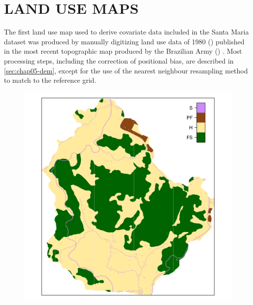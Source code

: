 \section{LAND USE MAPS}
\label{sec:chap05-land-use}

The first land use map used to derive covariate data included in the Santa Maria dataset was produced by 
manually digitizing land use data of \num{1980} (\landOld{}) published in the most recent 
topographic map produced by the Brazilian Army () \cite{DSG1992a, DSG1992}. Most processing 
steps, including the correction of positional bias, are described in \autoref{sec:chap05-dem}, except for 
the use of the nearest neighbour resampling method to match \landOld{} to the reference grid.

\begin{figure}[!ht]
\centering
\begin{minipage}[b]{63mm}
\subcaption{}
\centering
\includegraphics{fig/chap05-land-old}
\end{minipage}
\begin{minipage}[b]{63mm}
\subcaption{}
\centering

\end{minipage}
\end{figure}
